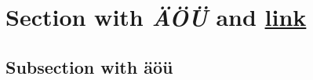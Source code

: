 \section{Section with \emph{ÄÖÜ} and \href{http://example.org/}{link}}
\subsection{Subsection with \textbf{äöü}}

